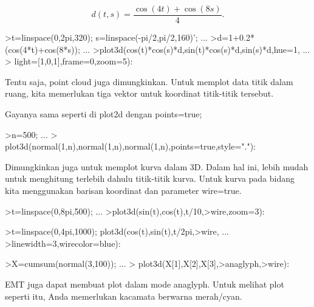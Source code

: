 \documentclass[a4paper,10pt]{article}
\begin{document}
\begin{eulernotebook}
\begin{eulercomment}
\end{eulercomment}
\begin{eulerformula}
\[
d(t,s) = \frac{\cos(4t)+\cos(8s)}{4}.
\]
\end{eulerformula}
\begin{eulerprompt}
>t=linspace(0,2pi,320); s=linspace(-pi/2,pi/2,160)'; ...
>d=1+0.2*(cos(4*t)+cos(8*s)); ...
>plot3d(cos(t)*cos(s)*d,sin(t)*cos(s)*d,sin(s)*d,hue=1, ...
>  light=[1,0,1],frame=0,zoom=5):
\end{eulerprompt}
\begin{eulercomment}
Tentu saja, point cloud juga dimungkinkan. Untuk memplot data titik
dalam ruang, kita memerlukan tiga vektor untuk koordinat titik-titik
tersebut.

Gayanya sama seperti di plot2d dengan points=true;
\end{eulercomment}
\begin{eulerprompt}
>n=500;  ...
>  plot3d(normal(1,n),normal(1,n),normal(1,n),points=true,style="."):
\end{eulerprompt}
\begin{eulercomment}
Dimungkinkan juga untuk memplot kurva dalam 3D. Dalam hal ini, lebih
mudah untuk menghitung terlebih dahulu titik-titik kurva. Untuk kurva
pada bidang kita menggunakan barisan koordinat dan parameter
wire=true.
\end{eulercomment}
\begin{eulerprompt}
>t=linspace(0,8pi,500); ...
>plot3d(sin(t),cos(t),t/10,>wire,zoom=3):
\end{eulerprompt}
\begin{eulerprompt}
>t=linspace(0,4pi,1000); plot3d(cos(t),sin(t),t/2pi,>wire, ...
>linewidth=3,wirecolor=blue):
\end{eulerprompt}
\begin{eulerprompt}
>X=cumsum(normal(3,100)); ...
> plot3d(X[1],X[2],X[3],>anaglyph,>wire):
\end{eulerprompt}
\begin{eulercomment}
EMT juga dapat membuat plot dalam mode anaglyph. Untuk melihat plot
seperti itu, Anda memerlukan kacamata berwarna merah/cyan.
\end{eulercomment}

\end{eulernotebook}
\end{document}
